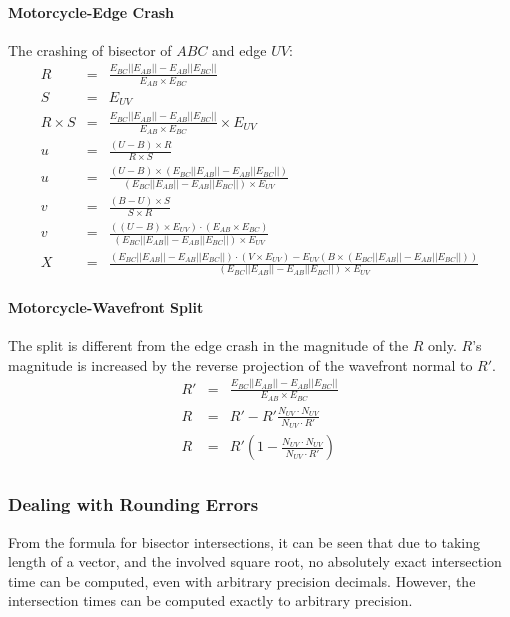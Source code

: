 \documentclass[12pt,a4paper,oneside,openany]{article}
\begin{document}
\paragraph{Motorcycle-Edge Crash}
The crashing of bisector of $ABC$ and edge $UV$:
\begin{eqnarray*}
R &=& \frac{E_{BC} || E_{AB} || - E_{AB}|| E_{BC} ||}{E_{AB} \times E_{BC}} \\
S &=& E_{UV} \\
R \times S &=& \frac{E_{BC} || E_{AB} || - E_{AB}|| E_{BC} ||}{E_{AB} \times E_{BC}} \times E_{UV} \\
u &=& \frac{(U-B) \times R}{R \times S} \\
u &=& \frac{(U-B) \times \left( E_{BC} || E_{AB} || - E_{AB}|| E_{BC} ||\right)}{(E_{BC} || E_{AB} || - E_{AB}|| E_{BC} ||) \times E_{UV}} \\
v &=& \frac{(B-U) \times S}{S \times R} \\
v &=& \frac{\left((U-B) \times E_{UV}\right) \cdot (E_{AB} \times E_{BC})}{(E_{BC} || E_{AB} || - E_{AB}|| E_{BC} ||) \times E_{UV}} \\
X &=& \frac{(E_{BC} || E_{AB} || - E_{AB}|| E_{BC} ||) \cdot (V \times E_{UV}) - E_{UV} (B \times (E_{BC} || E_{AB} || - E_{AB}|| E_{BC} ||))}{(E_{BC} || E_{AB} || - E_{AB}|| E_{BC} ||) \times E_{UV}}
\end{eqnarray*}

\paragraph{Motorcycle-Wavefront Split}

The split is different from the edge crash in the magnitude of the $R$ only. $R$'s magnitude is increased by the reverse projection of the wavefront normal to $R'$.
\begin{eqnarray*}
R' &=& \frac{E_{BC} || E_{AB} || - E_{AB}|| E_{BC} ||}{E_{AB} \times E_{BC}} \\
R &=& R' - R' \frac{N_{UV} \cdot N_{UV}}{N_{UV} \cdot R'} \\
R &=& R' \left( 1 - \frac{N_{UV} \cdot N_{UV}}{N_{UV} \cdot R'} \right)\\
\end{eqnarray*}


\subsubsection{Dealing with Rounding Errors}

From the formula for bisector intersections, it can be seen that due to taking length of a vector, and the involved square root, no absolutely exact intersection time can be computed, even with arbitrary precision decimals. However, the intersection times can be computed exactly to arbitrary precision.
\end{document}
